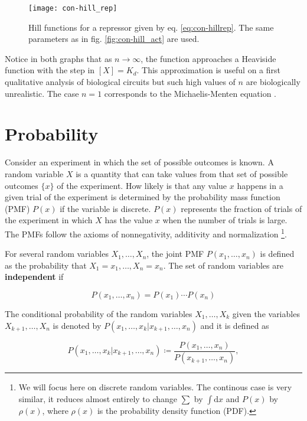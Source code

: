 \begin{figure}[H]
  \centering
  \texttt{[image: con-hill\_rep]}
  \caption[Hill functions for a repressor]{\label{fig:con-hill_rep} Hill functions for a repressor given by eq. \eqref{eq:con-hillrep}. The same parameters as in fig. \ref{fig:con-hill_act} are used.}
\end{figure}

Notice in both graphs that as $n\rightarrow\infty$, the function approaches a Heaviside function with the step in $[X] = K_d$. This approximation is useful on a first qualitative analysis of biological circuits but such high values of $n$ are biologically unrealistic. The case $n=1$ corresponds to the Michaelis-Menten equation \cite{alon06}.

\section{Probability}

Consider an experiment in which the set of possible outcomes is known. A random variable $X$ is a quantity that can take values from that set of possible outcomes $\{x\}$ of the experiment. How likely is that any value $x$ happens in a given trial of the experiment is determined by the probability mass function (PMF) $P(x)$ if the variable is discrete. $P(x)$ represents the fraction of trials of the experiment in which $X$ has the value $x$ when the number of trials is large. The PMFs follow the axioms of nonnegativity, additivity and normalization \cite{bertsekas08} \footnote{We will focus here on discrete random variables. The continous case is very similar, it reduces almost entirely to change $\sum$ by $\int\mathrm{d}x$ and $P(x)$ by $\rho(x)$, where $\rho(x)$ is the probability density function (PDF).}.

For several random variables $X_1,\dotsc,X_n$, the joint PMF  $P(x_1,\dotsc,x_n)$ is defined as the probability that $X_1=x_1,\dotsc,X_n=x_n$. The set of random variables are \textbf{independent} if

\begin{equation*}
  P(x_1,\dotsc,x_n) = P(x_1)\dotsm P(x_n)
\end{equation*}

The conditional probability of the random variables $X_1,\dotsc,X_k$ given the variables $X_{k+1},\dotsc,X_n$ is denoted by $P(x_1,\dotsc,x_k|x_{k+1},\dotsc,x_n)$ and it is defined as

\begin{equation*}
  P(x_1,\dotsc,x_k|x_{k+1},\dotsc,x_n) \coloneqq \frac{P(x_1,\dotsc,x_n)}{P(x_{k+1},\dotsc,x_n)},
\end{equation*}

